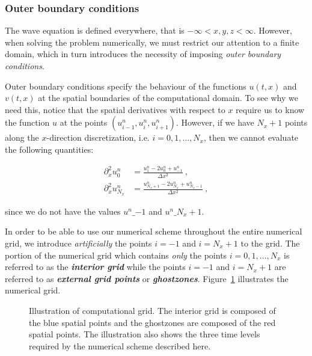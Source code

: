 \documentclass[a4paper,11pt]{article}
\begin{document}
\subsubsection{Outer boundary conditions}

The wave equation is defined everywhere, that is $-\infty<x,y,z<\infty$. However, when solving the problem numerically, we must restrict our attention to a finite domain, which in turn introduces the necessity of imposing \emph{outer boundary conditions}.

Outer boundary conditions specify the behaviour of the functions $u(t,x)$ and $v(t,x)$ at the spatial boundaries of the computational domain. To see why we need this, notice that the spatial derivatives with respect to $x$ require us to know the function $u$ at the points $\left(u_{i-1}^{n},u_{i}^{n},u_{i+1}^{n}\right)$. However, if we have $N_{x}+1$ points along the $x$-direction discretization, i.e. $i=0,1,\dots,N_{x}$, then we cannot evaluate the following quantities:

\begin{equation}
\begin{aligned}
\partial_{x}^{2}u^{n}_{0} &= \frac{u^{n}_{1} - 2u^{n}_{0} + u^{n}_{-1}}{\Delta x^{2}}\ ,\\
\partial_{x}^{2}u^{n}_{N_{x}} &= \frac{u^{n}_{N_{x}+1} - 2u^{n}_{N_{x}} + u^{n}_{N_{x}-1}}{\Delta x^{2}}\ ,
\end{aligned}
\end{equation}

\noindent since we do not have the values $u^{n}\_{-1}$ and $u^{n}\_{N_{x}+1}$.

In order to be able to use our numerical scheme throughout the entire numerical grid, we introduce \emph{artificially} the points $i=-1$ and $i=N_{x}+1$ to the grid. The portion of the numerical grid which contains \emph{only} the points $i=0,1,\dots,N_{x}$ is referred to as the \emph{\textbf{interior grid}} while the points $i=-1$ and $i=N_{x}+1$ are referred to as \emph{\textbf{external grid points}}  or \emph{\textbf{ghostzones}}. Figure~\ref{Figure1} illustrates the numerical grid.

\begin{figure}[ht]
\centering

\caption[Illustration of computational grid.]{Illustration of computational grid. The interior grid is composed of the blue spatial points and the ghostzones are composed of the red spatial points. The illustration also shows the three time levels required by the numerical scheme described here.}
\label{Figure1}
\end{figure}
\end{document}
